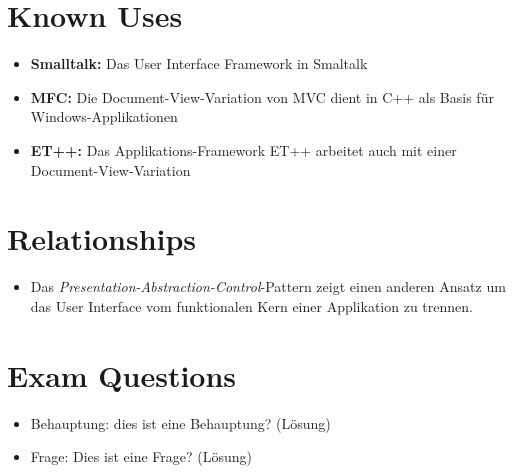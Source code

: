 \section{Known Uses}
\begin{itemize}
	\item \textbf{Smalltalk:} Das User Interface Framework in Smaltalk
	\item \textbf{MFC:} Die Document-View-Variation von MVC dient in C++ als Basis für Windows-Applikationen
	\item \textbf{ET++:} Das Applikations-Framework ET++ arbeitet auch mit einer Document-View-Variation
\end{itemize}

\section{Relationships}
\begin{itemize}
	\item Das \textit{Presentation-Abstraction-Control}-Pattern zeigt einen anderen Ansatz um das User Interface vom funktionalen Kern einer Applikation zu trennen.
\end{itemize}

\section{Exam Questions}
\begin{itemize}
  \item Behauptung: dies ist eine Behauptung? (Lösung)
    \item Frage: Dies ist eine Frage? (Lösung)
\end{itemize}
